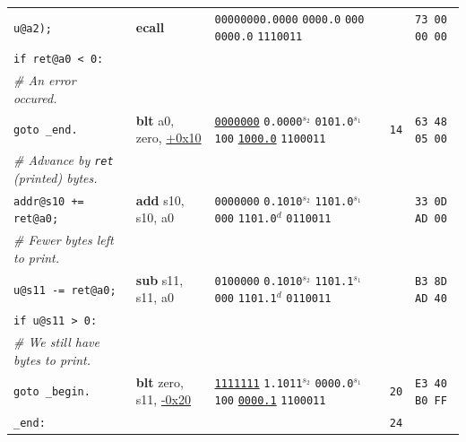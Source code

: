 \documentclass[a4paper,12pt,final]{article}
\begin{document}
\begin{table}[!htbp]
\begin{adjustwidth}{-1cm}{-1cm}
\begin{center}
\begin{tabular}{l|ll|l|l}
\hspace{1em}\hspace{7.371000em}    \texttt{u@a2);} & \textbf{ecall} & \texttt{00000000.0000}                      \texttt{0000.0}          \texttt{000} \texttt{0000.0}          \texttt{1110011} &  & \texttt{73 00 00 00}\\[0pt]
\hspace{1em} \texttt{if ret@a0 < 0:} &  &  &  & \\[0pt]
\hspace{2em} \emph{\# An error occured.} &  &  &  & \\[0pt]
\hspace{2em}     \texttt{goto \_end.} & \textbf{blt} a0, zero, \uline{+0x10} & \uline{\texttt{0000000}} \texttt{0.0000}​\(^{s_{2}}\) \texttt{0101.0}​\(^{s_{1}}\) \texttt{100} \uline{\texttt{1000.0}} \texttt{1100011} & \texttt{14} & \texttt{63 48 05 00}\\[0pt]
\hspace{1em} \emph{\# Advance by \texttt{ret} (printed) bytes.} &  &  &  & \\[0pt]
\hspace{1em} \texttt{addr@s10 += ret@a0;} & \textbf{add} s10, s10, a0 & \texttt{0000000} \texttt{0.1010}​\(^{s_{2}}\) \texttt{1101.0}​\(^{s_{1}}\) \texttt{000} \texttt{1101.0}​\(^{d}\)  \texttt{0110011} &  & \texttt{33 0D AD 00}\\[0pt]
\hspace{1em} \emph{\# Fewer bytes left to print.} &  &  &  & \\[0pt]
\hspace{1em} \texttt{u@s11 -= ret@a0;} & \textbf{sub} s11, s11, a0 & \texttt{0100000} \texttt{0.1010}​\(^{s_{2}}\) \texttt{1101.1}​\(^{s_{1}}\) \texttt{000} \texttt{1101.1}​\(^{d}\)  \texttt{0110011} &  & \texttt{B3 8D AD 40}\\[0pt]
\hspace{1em} \texttt{if u@s11 > 0:} &  &  &  & \\[0pt]
\hspace{2em}     \emph{\# We still have bytes to print.} &  &  &  & \\[0pt]
\hspace{2em}     \texttt{goto \_begin.} & \textbf{blt} zero, s11, \uline{-0x20} & \uline{\texttt{1111111}} \texttt{1.1011}​\(^{s_{2}}\) \texttt{0000.0}​\(^{s_{1}}\) \texttt{100} \uline{\texttt{0000.1}} \texttt{1100011} & \texttt{20} & \texttt{E3 40 B0 FF}\\[0pt]
\texttt{\_end:} &  &  & \texttt{24} & \\[0pt]

\end{tabular}
\end{center}
\end{adjustwidth}
\end{table}
\end{document}
